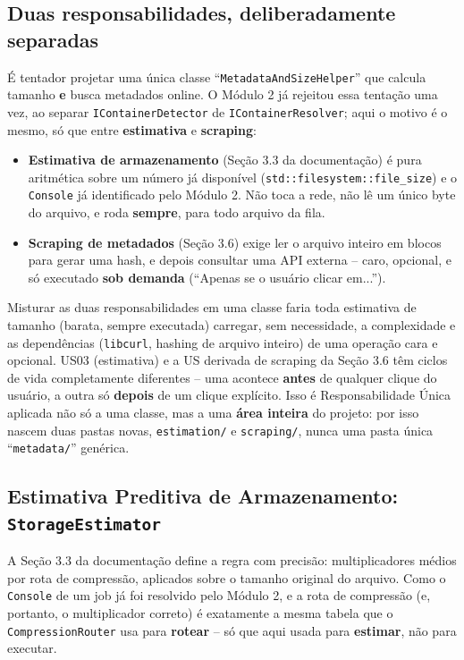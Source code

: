\subsection{Duas responsabilidades, deliberadamente separadas}

É tentador projetar uma única classe ``\texttt{MetadataAndSizeHelper}'' que calcula tamanho \textbf{e} busca metadados online. O Módulo 2 já rejeitou essa tentação uma vez, ao separar \texttt{IContainerDetector} de \texttt{IContainerResolver}; aqui o motivo é o mesmo, só que entre \textbf{estimativa} e \textbf{scraping}:

\begin{itemize}
    \item \textbf{Estimativa de armazenamento} (Seção 3.3 da documentação) é pura aritmética sobre um número já disponível (\texttt{std::filesystem::file\_size}) e o \texttt{Console} já identificado pelo Módulo 2. Não toca a rede, não lê um único byte do arquivo, e roda \textbf{sempre}, para todo arquivo da fila.
    \item \textbf{Scraping de metadados} (Seção 3.6) exige ler o arquivo inteiro em blocos para gerar uma hash, e depois consultar uma API externa -- caro, opcional, e só executado \textbf{sob demanda} (``Apenas se o usuário clicar em...'').
\end{itemize}

\begin{CaixaAlerta}
Misturar as duas responsabilidades em uma classe faria toda estimativa de tamanho (barata, sempre executada) carregar, sem necessidade, a complexidade e as dependências (\texttt{libcurl}, hashing de arquivo inteiro) de uma operação cara e opcional. US03 (estimativa) e a US derivada de scraping da Seção 3.6 têm ciclos de vida completamente diferentes -- uma acontece \textbf{antes} de qualquer clique do usuário, a outra só \textbf{depois} de um clique explícito. Isso é Responsabilidade Única aplicada não só a uma classe, mas a uma \textbf{área inteira} do projeto: por isso nascem duas pastas novas, \texttt{estimation/} e \texttt{scraping/}, nunca uma pasta única ``\texttt{metadata/}'' genérica.
\end{CaixaAlerta}

\subsection{Estimativa Preditiva de Armazenamento: \texttt{StorageEstimator}}

A Seção 3.3 da documentação define a regra com precisão: multiplicadores médios por rota de compressão, aplicados sobre o tamanho original do arquivo. Como o \texttt{Console} de um job já foi resolvido pelo Módulo 2, e a rota de compressão (e, portanto, o multiplicador correto) é exatamente a mesma tabela que o \texttt{CompressionRouter} usa para \textbf{rotear} -- só que aqui usada para \textbf{estimar}, não para executar.

